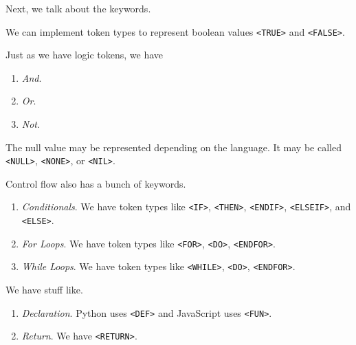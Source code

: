   Next, we talk about the keywords. 

  \begin{example}[Boolean]
    \label{ex:boolean}
    We can implement token types to represent boolean values \texttt{<TRUE>} and \texttt{<FALSE>}. 
  \end{example}

  \begin{example}
    \label{ex:logic-keywords}
    Just as we have logic tokens, we have 
    \begin{enumerate}
      \item \textit{And}. 
      \item \textit{Or}. 
      \item \textit{Not}. 
    \end{enumerate}
  \end{example}

  \begin{example}
    \label{ex:null-value}
    The null value may be represented depending on the language. It may be called \texttt{<NULL>}, \texttt{<NONE>}, or \texttt{<NIL>}. 
  \end{example}

  \begin{example}
    \label{ex:control-flow}
    Control flow also has a bunch of keywords. 
    \begin{enumerate}
      \item \textit{Conditionals}. We have token types like \texttt{<IF>}, \texttt{<THEN>}, \texttt{<ENDIF>}, \texttt{<ELSEIF>}, and \texttt{<ELSE>}. 
      \item \textit{For Loops}. We have token types like \texttt{<FOR>}, \texttt{<DO>}, \texttt{<ENDFOR>}. 
      \item \textit{While Loops}. We have token types like \texttt{<WHILE>}, \texttt{<DO>}, \texttt{<ENDFOR>}. 
    \end{enumerate}
  \end{example}

  \begin{example}[Functions]
    \label{ex:functions}
    We have stuff like. 
    \begin{enumerate}
      \item \textit{Declaration}. Python uses \texttt{<DEF>} and JavaScript uses \texttt{<FUN>}. 
      \item \textit{Return}. We have \texttt{<RETURN>}. 
    \end{enumerate}
  \end{example}

